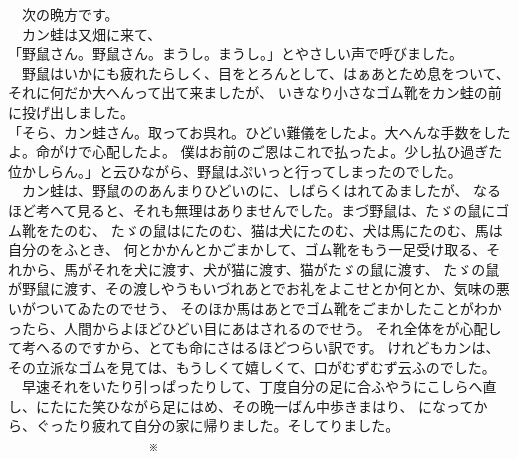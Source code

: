 \documentclass[
a4paper,
book]
{tarticle}
\begin{document}
　次の晩方です。\\
　カン蛙は又畑に来て、\\
「野鼠さん。野鼠さん。まうし。まうし。」とやさしい声で呼びました。\\
　野鼠はいかにも疲れたらしく、目をとろんとして、はぁあとため息をついて、それに何だか大へんって出て来ましたが、
いきなり小さなゴム靴をカン蛙の前に投げ出しました。\\
「そら、カン蛙さん。取ってお呉れ。ひどい難儀をしたよ。大へんな手数をしたよ。命がけで心配したよ。
僕はお前のご恩はこれで払ったよ。少し払ひ過ぎた位かしらん。」と云ひながら、野鼠はぷいっと行ってしまったのでした。\\
　カン蛙は、野鼠ののあんまりひどいのに、しばらくはれてゐましたが、
なるほど考へて見ると、それも無理はありませんでした。まづ野鼠は、たゞの鼠にゴム靴をたのむ、
たゞの鼠はにたのむ、猫は犬にたのむ、犬は馬にたのむ、馬は自分のをふとき、
何とかかんとかごまかして、ゴム靴をもう一足受け取る、それから、馬がそれを犬に渡す、犬が猫に渡す、猫がたゞの鼠に渡す、
たゞの鼠が野鼠に渡す、その渡しやうもいづれあとでお礼をよこせとか何とか、気味の悪いがついてゐたのでせう、
そのほか馬はあとでゴム靴をごまかしたことがわかったら、人間からよほどひどい目にあはされるのでせう。
それ全体をが心配して考へるのですから、とても命にさはるほどつらい訳です。
けれどもカンは、その立派なゴムを見ては、もうしくて嬉しくて、口がむずむず云ふのでした。\\
　早速それをいたり引っぱったりして、丁度自分の足に合ふやうにこしらへ直し、にたにた笑ひながら足にはめ、その晩一ばん中歩きまはり、
になってから、ぐったり疲れて自分の家に帰りました。そしてりました。\\

　　　　　　　　　　※\\
\end{document}
